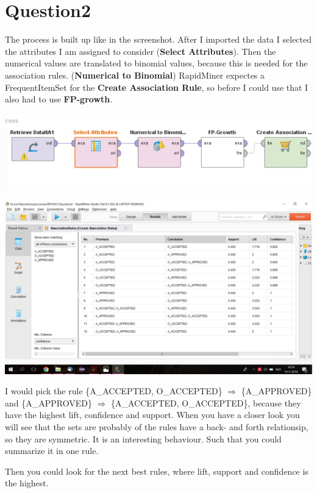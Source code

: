\section*{Question2}
The process is built up like in the screenshot. After I imported the data I
selected the attributes I am assigned to consider (\textbf{Select Attributes}).
Then the numerical values are translated to binomial values, because this is needed for the association
rules. (\textbf{Numerical to Binomial}) RapidMiner expectes a FrequentItemSet
for the \textbf{Create Association Rule}, so before I could use that I also had
to use \textbf{FP-growth}.

\includegraphics[width=\textwidth]{Question2Process.jpg}

\includegraphics[width=\textwidth]{Question2Rapid.jpg}

I would pick the rule \{A\_ACCEPTED, O\_ACCEPTED\} $\Rightarrow$	\{A\_APPROVED\}
and \{A\_APPROVED\} $\Rightarrow$	\{A\_ACCEPTED, O\_ACCEPTED\}, because they
have the highest lift, confidence and support. When you have a closer look you
will see that the sets are probably of the rules have a back- and forth
relationsip, so they are symmetric. It is an interesting behaviour. Such that
you could summarize it in one rule. 

Then you could look for the next best rules, where lift, support and confidence is the highest.
